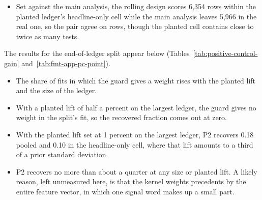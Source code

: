 \begin{itemize}
\item Set against the main analysis, the rolling design scores 6,354 rows within the planted ledger's headline-only cell while the main analysis leaves 5,966 in the real one, so the pair agree on rows, though the planted cell contains close to twice as many tests.
\end{itemize}

The results for the end-of-ledger split appear below (Tables~\ref{tab:positive-control-gain} and~\ref{tab:fmt-app-pc-point}).
\begin{itemize}
\item The share of fits in which the guard gives a weight rises with the planted lift and the size of the ledger.
\item With a planted lift of half a percent on the largest ledger, the guard gives no weight in the split's fit, so the recovered fraction comes out at zero.
\item With the planted lift set at 1 percent on the largest ledger, P2 recovers 0.18 pooled and 0.10 in the headline-only cell, where that lift amounts to a third of a prior standard deviation.
\item P2 recovers no more than about a quarter at any size or planted lift. A likely reason, left unmeasured here, is that the kernel weights precedents by the entire feature vector, in which one signal word makes up a small part.
\end{itemize}

